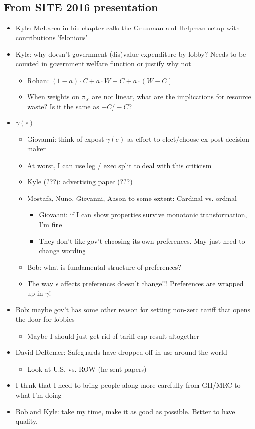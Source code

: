 \documentclass[12pt]{article}
\newcommand{\ga}{\gamma}
\begin{document}
\subsection{From SITE 2016 presentation}
\begin{itemize}
	\item Kyle: McLaren in his chapter calls the Grossman and Helpman setup with contributions 'felonious'
	\item Kyle: why doesn't government (dis)value expenditure by lobby? Needs to be counted in government welfare function or justify why not
		\begin{itemize}
			\item Rohan: $(1-a)\cdot C + a \cdot W \equiv C + a \cdot (W-C)$
			\item When weights on $\pi_X$ are not linear, what are the implications for resource waste? Is it the same as $+ C / - C$?
		\end{itemize}
	\item $\ga(e)$
		\begin{itemize}
			\item Giovanni: think of expost $\ga(e)$ as effort to elect/choose ex-post decision-maker
			\item At worst, I can use leg / exec split to deal with this criticism
			\item Kyle (???): advertising paper (???)
			\item Mostafa, Nuno, Giovanni, Anson to some extent: Cardinal vs. ordinal
				\begin{itemize}
					\item Giovanni: if I can show properties survive  monotonic transformation, I'm fine
					\item They don't like gov't choosing its own preferences. May just need to change wording
				\end{itemize}
			\item Bob: what is fundamental structure of preferences?
			\item The way $e$ affects preferences doesn't change!!! Preferences are wrapped up in $\ga$!
		\end{itemize}
	\item Bob: maybe gov't has some other reason for setting non-zero tariff that opens the door for lobbies
		\begin{itemize}
			\item Maybe I should just get rid of tariff cap result altogether
		\end{itemize}
	\item David DeRemer: Safeguards have dropped off in use around the world
		\begin{itemize}
			\item Look at U.S. vs. ROW (he sent papers)
		\end{itemize}
	\item I think that I need to bring people along more carefully from GH/MRC to what I'm doing
	\item Bob and Kyle: take my time, make it as good as possible. Better to have quality.
\end{itemize}
\end{document}
